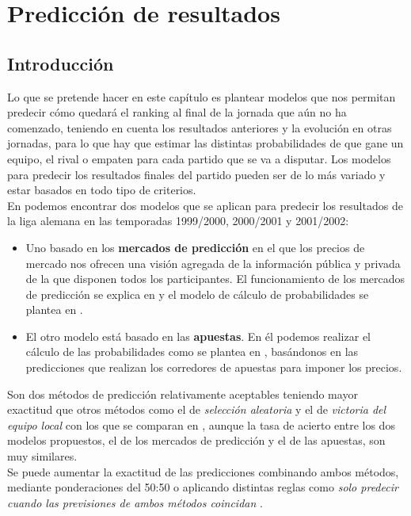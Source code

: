 \chapter{Predicción de resultados}

\section{Introducción}
Lo que se pretende hacer en este capítulo es plantear modelos que nos permitan predecir cómo quedará el ranking al final de la jornada que aún no ha comenzado, teniendo en cuenta los resultados anteriores y la evolución en otras jornadas, para lo que hay que estimar las distintas probabilidades de que gane un equipo, el rival o empaten para cada partido que se va a disputar. Los modelos para predecir los resultados finales del partido pueden ser de lo más variado y estar basados en todo tipo de criterios.\\

En \cite{refpred1} podemos encontrar dos modelos que se aplican para predecir los resultados de la liga alemana en las temporadas 1999/2000, 2000/2001 y 2001/2002:
\begin{itemize}
	\item Uno basado en los \textbf{mercados de predicción} en el que los precios de mercado nos ofrecen una visión agregada de la información pública y privada de la que disponen todos los participantes. El funcionamiento de los mercados de predicción se explica en \cite[Tabla II]{refpred1} y el modelo de cálculo de probabilidades se plantea en \cite[pág 62]{refpred1}.
	\item El otro modelo está basado en las \textbf{apuestas}. En él podemos realizar el cálculo de las probabilidades como se plantea en \cite[págs 62-63]{refpred1}, basándonos en las predicciones que realizan los corredores de apuestas para imponer los precios.
\end{itemize}

Son dos métodos de predicción relativamente aceptables teniendo mayor exactitud que otros métodos como el de \textit{selección aleatoria} y el de \textit{victoria del equipo local} con los que se comparan en \cite[págs 64-66]{refpred1}, aunque la tasa de acierto entre los dos modelos propuestos, el de los mercados de predicción y el de las apuestas, son muy similares.\\
Se puede aumentar la exactitud de las predicciones combinando ambos métodos, mediante ponderaciones del 50:50 o aplicando distintas reglas como \textit{solo predecir cuando las previsiones de ambos métodos coincidan} \cite[págs 66-67]{refpred1}.\\


